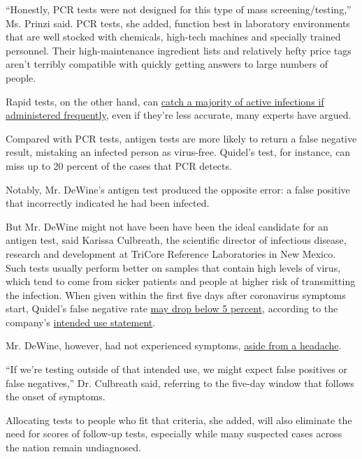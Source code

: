 ``Honestly, PCR tests were not designed for this type of mass
screening/testing,'' Ms. Prinzi said. PCR tests, she added, function
best in laboratory environments that are well stocked with chemicals,
high-tech machines and specially trained personnel. Their
high-maintenance ingredient lists and relatively hefty price tags aren't
terribly compatible with quickly getting answers to large numbers of
people.

Rapid tests, on the other hand, can
\href{https://www.nytimes3xbfgragh.onion/2020/08/06/health/rapid-Covid-tests.html}{catch
a majority of active infections if administered frequently}, even if
they're less accurate, many experts have argued.

Compared with PCR tests, antigen tests are more likely to return a false
negative result, mistaking an infected person as virus-free. Quidel's
test, for instance, can miss up to 20 percent of the cases that PCR
detects.

Notably, Mr. DeWine's antigen test produced the opposite error: a false
positive that incorrectly indicated he had been infected.

But Mr. DeWine might not have been have been the ideal candidate for an
antigen test, said Karissa Culbreath, the scientific director of
infectious disease, research and development at TriCore Reference
Laboratories in New Mexico. Such tests usually perform better on samples
that contain high levels of virus, which tend to come from sicker
patients and people at higher risk of transmitting the infection. When
given within the first five days after coronavirus symptoms start,
Quidel's false negative rate
\href{https://www.businesswire.com/news/home/20200717005579/en/Quidel\%E2\%80\%99s-Sofia\%C2\%AE-SARS-Antigen-FIA-Updates-EUA}{may
drop below 5 percent}, according to the company's
\href{https://www.quidel.com/sites/default/files/product/documents/EF1438902EN00.pdf}{intended
use statement}.

Mr. DeWine, however, had not experienced symptoms,
\href{https://www.nytimes3xbfgragh.onion/2020/08/06/us/mike-dewine-coronavirus.html}{aside
from a headache}.

``If we're testing outside of that intended use, we might expect false
positives or false negatives,'' Dr. Culbreath said, referring to the
five-day window that follows the onset of symptoms.

Allocating tests to people who fit that criteria, she added, will also
eliminate the need for scores of follow-up tests, especially while many
suspected cases across the nation remain undiagnosed.

